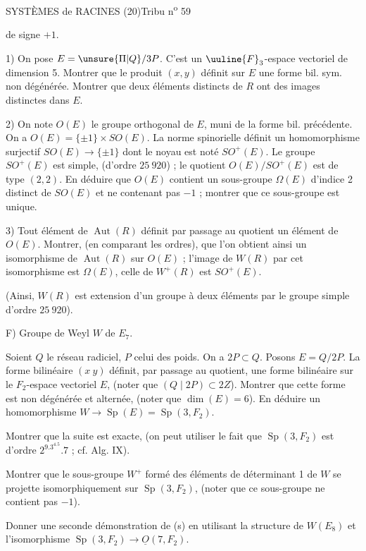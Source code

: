 
SYSTÈMES de RACINES (20)\hfill Tribu n\textsuperscript{o} 59

de signe $+1$.

1) On pose $E=\unsure{\Pi|Q}/3P$. C'est un $\uuline{F}_3$-espace vectoriel de dimension 5. Montrer que le produit $(x,y)$ définit sur $E$ une forme bil. sym. non dégénérée. Montrer que deux éléments distincts de $R$ ont des images distinctes dans $E$.

2) On note $O(E)$ le groupe orthogonal de $E$, muni de la forme bil. précédente. On a $O(E)=\{\pm1\}\times SO(E)$. La norme spinorielle définit un homomorphisme surjectif $SO(E)\longrightarrow\{\pm1\}$ dont le noyau est noté $SO^+(E)$. Le groupe $SO^+(E)$ est simple, (d'ordre $25\ 920$) ; le quotient $O(E)/SO^+(E)$ est de type $(2,2)$. En déduire que $O(E)$ contient un sous-groupe $\Omega(E)$ d'indice 2 distinct de $SO(E)$ et ne contenant pas $-1$ ; montrer que ce sous-groupe est unique.

3) Tout élément de $\operatorname{Aut}(R)$ définit par passage au quotient un élément de $O(E)$. Montrer, (en comparant les ordres), que l'on obtient ainsi un isomorphisme de $\operatorname{Aut}(R)$ sur $O(E)$ ; l'image de $W(R)$ par cet isomorphisme est $\Omega(E)$, celle de $W^+(R)$ est $SO^+(E)$.

(Ainsi, $W(R)$ est extension d'un groupe à deux éléments par le groupe simple d'ordre $25\ 920$).

F) Groupe de Weyl $W$ de $E_7$.

Soient $Q$ le réseau radiciel, $P$ celui des poids. On a $2P\subset Q$. Posons $E=Q/2P$. La forme bilinéaire $(x\ y)$ définit, par passage au quotient, une forme bilinéaire sur le $F_2$-espace vectoriel $E$, (noter que $(Q\mid 2P)\subset 2Z$). Montrer que cette forme est non dégénérée et alternée, (noter que $\dim(E)=6$). En déduire un homomorphisme $W\longrightarrow\operatorname{Sp}(E)=\operatorname{Sp}(3,F_2)$.

Montrer que la suite
est exacte, (on peut utiliser le fait que $\operatorname{Sp}(3,F_2)$ est d'ordre $2^9.3^4.5.7$ ; cf. Alg. IX).

Montrer que le sous-groupe $W^+$ formé des éléments de déterminant 1 de $W$ se projette isomorphiquement sur $\operatorname{Sp}(3,F_2)$, (noter que ce sous-groupe ne contient pas $-1$).

Donner une seconde démonstration de (s) en utilisant la structure de $W(E_8)$ et l'isomorphisme $\operatorname{Sp}(3,F_2)\longrightarrow\underline{O}(7,F_2)$.

